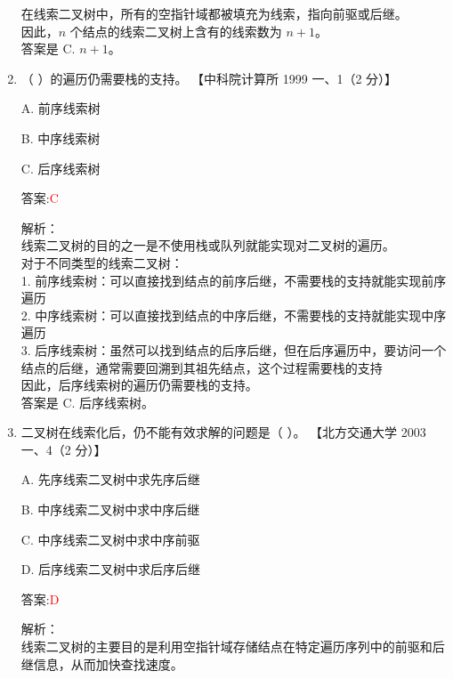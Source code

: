 \documentclass[lang=cn,newtx,10pt,scheme=chinese]{../../../elegantbook}
\begin{document}
\begin{enumerate}
    在线索二叉树中，所有的空指针域都被填充为线索，指向前驱或后继。\\
    
    因此，$n$ 个结点的线索二叉树上含有的线索数为 $n+1$。\\
    
    答案是 C. $n+1$。\\  

    \item （ ）的遍历仍需要栈的支持。  
    【中科院计算所 1999 一、1（2 分）】  

    A. 前序线索树  

    B. 中序线索树  

    C. 后序线索树  

    答案:\textcolor{red}{C}
    
    解析：\\
    线索二叉树的目的之一是不使用栈或队列就能实现对二叉树的遍历。\\
    
    对于不同类型的线索二叉树：\\
    1. 前序线索树：可以直接找到结点的前序后继，不需要栈的支持就能实现前序遍历\\
    2. 中序线索树：可以直接找到结点的中序后继，不需要栈的支持就能实现中序遍历\\
    3. 后序线索树：虽然可以找到结点的后序后继，但在后序遍历中，要访问一个结点的后继，通常需要回溯到其祖先结点，这个过程需要栈的支持\\
    
    因此，后序线索树的遍历仍需要栈的支持。\\
    
    答案是 C. 后序线索树。\\  

    \item 二叉树在线索化后，仍不能有效求解的问题是（ ）。  
    【北方交通大学 2003 一、4（2 分）】 

    A. 先序线索二叉树中求先序后继  

    B. 中序线索二叉树中求中序后继  

    C. 中序线索二叉树中求中序前驱 

    D. 后序线索二叉树中求后序后继  

    答案:\textcolor{red}{D}
    
    解析：\\
    线索二叉树的主要目的是利用空指针域存储结点在特定遍历序列中的前驱和后继信息，从而加快查找速度。\\
    

\end{enumerate}
\end{document}
